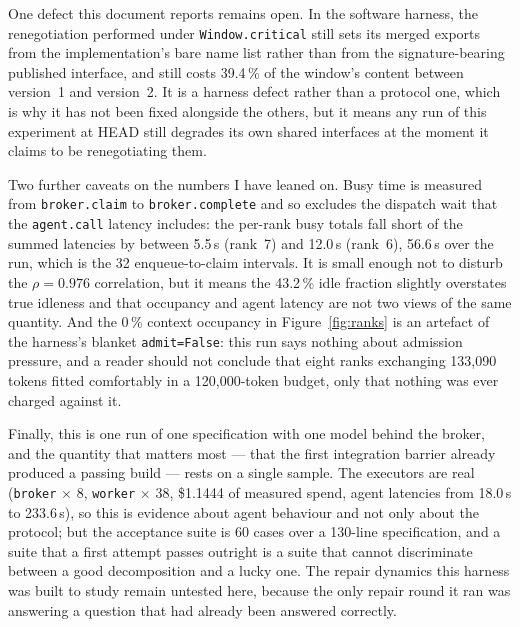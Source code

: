\documentclass[11pt]{article}
\begin{document}
One defect this document reports remains open. In the software harness, the renegotiation
performed under \texttt{Window.critical} still sets its merged exports from the
implementation's bare name list rather than from the signature-bearing published interface, and
still costs 39.4\,\% of the window's content between version~1 and version~2. It is a harness
defect rather than a protocol one, which is why it has not been fixed alongside the others, but
it means any run of this experiment at HEAD still degrades its own shared interfaces at the
moment it claims to be renegotiating them.

Two further caveats on the numbers I have leaned on. Busy time is measured from
\texttt{broker.claim} to \texttt{broker.complete} and so excludes the dispatch wait that the
\texttt{agent.call} latency includes: the per-rank busy totals fall short of the summed
latencies by between 5.5\,s (rank~7) and 12.0\,s (rank~6), 56.6\,s over the run, which is the
32 enqueue-to-claim intervals. It is small enough not to disturb the $\rho = 0.976$
correlation, but it means the 43.2\,\% idle fraction slightly overstates true idleness and
that occupancy and agent latency are not two views of the same quantity. And
the 0\,\% context occupancy in Figure~\ref{fig:ranks} is an artefact of the harness's blanket
\texttt{admit=False}: this run says nothing about admission pressure, and a reader should not
conclude that eight ranks exchanging 133{,}090 tokens fitted comfortably in a 120{,}000-token
budget, only that nothing was ever charged against it.

Finally, this is one run of one specification with one model behind the broker, and the
quantity that matters most --- that the first integration barrier already produced a passing
build --- rests on a single sample. The executors are real (\texttt{broker} $\times$ 8,
\texttt{worker} $\times$ 38, \$1.1444 of measured spend, agent latencies from 18.0\,s to
233.6\,s), so this is evidence about agent behaviour and not only about the protocol; but the
acceptance suite is 60 cases over a 130-line specification, and a suite that a first attempt
passes outright is a suite that cannot discriminate between a good decomposition and a lucky
one. The repair dynamics this harness was built to study remain untested here, because the
only repair round it ran was answering a question that had already been answered correctly.
\end{document}
